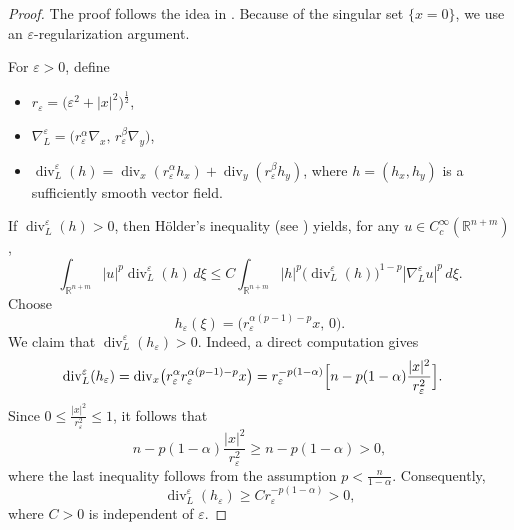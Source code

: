 \documentclass[12pt]{amsart}
\begin{document}
\begin{proof}
The proof follows the idea in \cite{ambrosio}. Because of the singular set
$\{x=0\}$, we use an $\varepsilon$-regularization argument.

For $\varepsilon>0$, define
\begin{itemize}
    \item $r_\varepsilon=\bigl(\varepsilon^2+|x|^2\bigr)^{\frac12}$,
    \item $\nabla_L^\varepsilon=\bigl(r_\varepsilon^\alpha\nabla_x,\,
    r_\varepsilon^\beta\nabla_y\bigr)$,
    \item $\operatorname{div}_L^\varepsilon(h)
    =
    \operatorname{div}_x(r_\varepsilon^\alpha h_x)
    +
    \operatorname{div}_y(r_\varepsilon^\beta h_y)$, where $h=(h_x,h_y)$ is a sufficiently smooth vector field.
\end{itemize}
If $\operatorname{div}_L^\varepsilon(h)>0$, then Hölder's inequality
(see \cite[Theorem~3.5]{ambrosio}) yields, for any
$u\in C_c^\infty(\mathbb R^{n+m})$,
\begin{equation}\label{divergence_x}
    \int_{\mathbb R^{n+m}}
    |u|^p\operatorname{div}_L^\varepsilon(h)\,d\xi
    \leq
    C
    \int_{\mathbb R^{n+m}}
    |h|^p
    \bigl(
        \operatorname{div}_L^\varepsilon(h)
    \bigr)^{1-p}
    |\nabla_L^\varepsilon u|^p \, d\xi.
\end{equation}
Choose
\begin{equation}\label{choice_h_x}
    h_\varepsilon(\xi)
    =
    \bigl(
        r_\varepsilon^{\alpha(p-1)-p}x,\,
        0
    \bigr).
\end{equation}
We claim that $\operatorname{div}_L^\varepsilon(h_\varepsilon)>0$. Indeed, a direct computation gives
\begin{align*}
    \operatorname{div}_L^\varepsilon(h_\varepsilon)
    &=
    \operatorname{div}_x
    \bigl(
        r_\varepsilon^\alpha r_\varepsilon^{\alpha(p-1)-p}x
    \bigr)
    =r_\varepsilon^{-p(1-\alpha)}
    \Bigl[
        n
        -
        p(1-\alpha)\frac{|x|^2}{r_\varepsilon^2}
    \Bigr].
\end{align*}
Since $0\leq \frac{|x|^2}{r_\varepsilon^2}\leq 1$, it follows that
\begin{equation}\label{>0_x}
    n
    -
    p(1-\alpha)\frac{|x|^2}{r_\varepsilon^2}
    \geq
    n-p(1-\alpha)>0,
\end{equation}
where the last inequality follows from the assumption $p<\frac{n}{1-\alpha}$. Consequently,
\begin{equation}\label{div_lower_x}
    \operatorname{div}_L^\varepsilon(h_\varepsilon)
    \geq
    C r_\varepsilon^{-p(1-\alpha)}
    >0,
\end{equation}
where $C>0$ is independent of $\varepsilon$.


\end{proof}
\end{document}
